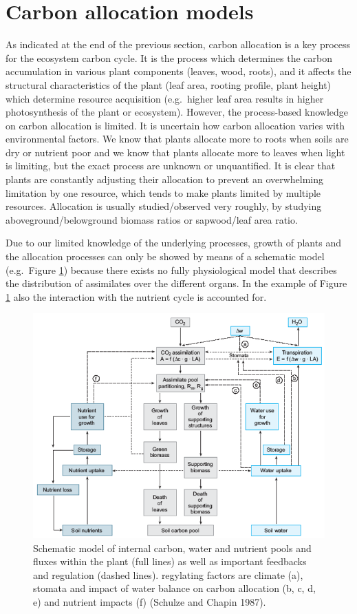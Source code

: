 \documentclass[12pt,oneside]{book}
\begin{document}
\section{Carbon allocation models}\label{carbon-allocation-models}

As indicated at the end of the previous section, carbon allocation is a
key process for the ecosystem carbon cycle. It is the process which
determines the carbon accumulation in various plant components (leaves,
wood, roots), and it affects the structural characteristics of the plant
(leaf area, rooting profile, plant height) which determine resource
acquisition (e.g.~higher leaf area results in higher photosynthesis of
the plant or ecosystem). However, the process-based knowledge on carbon
allocation is limited. It is uncertain how carbon allocation varies with
environmental factors. We know that plants allocate more to roots when
soils are dry or nutrient poor and we know that plants allocate more to
leaves when light is limiting, but the exact process are unknown or
unquantified. It is clear that plants are constantly adjusting their
allocation to prevent an overwhelming limitation by one resource, which
tends to make plants limited by multiple resources. Allocation is
usually studied/observed very roughly, by studying
aboveground/belowground biomass ratios or sapwood/leaf area ratio.

Due to our limited knowledge of the underlying processes, growth of
plants and the allocation processes can only be showed by means of a
schematic model (e.g.~Figure \ref{fig:f57}) because there exists no
fully physiological model that describes the distribution of assimilates
over the different organs. In the example of Figure \ref{fig:f57} also
the interaction with the nutrient cycle is accounted for.

\begin{figure}

{\centering \includegraphics[width=0.8\linewidth]{figures/chap5/f57_schulze_alloc} 

}

\caption{Schematic model of internal carbon, water and nutrient pools and fluxes within the plant (full lines) as well as important feedbacks and regulation (dashed lines). regylating factors are climate (a), stomata and impact of water balance on carbon allocation (b, c, d, e) and nutrient impacts (f) (Schulze and Chapin 1987).}\label{fig:f57}
\end{figure}
\end{document}
